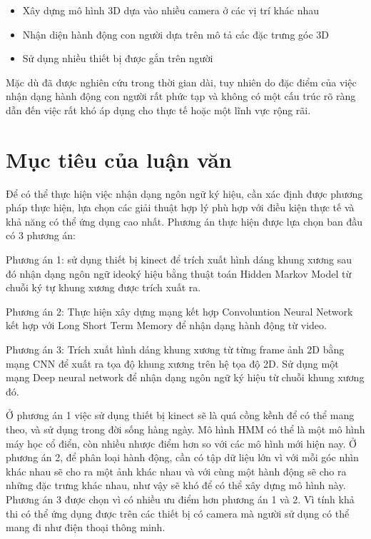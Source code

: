 \begin{itemize}
\item Xây dựng mô hình 3D dựa vào nhiều camera ở các vị trí khác nhau \cite{HLUT1}
\item Nhận diện hành động con người dựa trên mô tả các đặc trưng góc 3D \cite{6693448}
\item Sử dụng nhiều thiết bị được gắn trên người \cite{4650859}
\end{itemize}

Mặc dù đã được nghiên cứu trong thời gian dài, tuy nhiên do đặc điểm của việc nhận dạng hành động con người rất phức tạp và không có một cấu trúc rõ ràng dẫn đến việc rất khó áp dụng cho thực tế hoặc một lĩnh vực rộng rãi.

\section{Mục tiêu của luận văn}

Để có thể thực hiện việc nhận dạng ngôn ngữ ký hiệu, cần xác định được phương pháp thực hiện, lựa chọn các giải thuật hợp lý phù hợp với điều kiện thực tế và khả năng có thể ứng dụng cao nhất.
Phương án thực hiện được lựa chọn ban đầu có 3 phương án: 

Phương án 1: sử dụng thiết bị kinect để trích xuất hình dáng khung xương sau đó nhận dạng ngôn ngữ ideoký hiệu bằng thuật toán Hidden Markov Model từ chuỗi ký tự khung xương được trích xuất ra.

Phương án 2: Thực hiện xây dựng mạng kết hợp Convoluntion Neural Network kết hợp với Long Short Term Memory để nhận dạng hành động từ video.

Phương án 3: Trích xuất hình dáng khung xương từ từng frame ảnh 2D bằng mạng CNN để xuất ra tọa độ khung xương trên hệ tọa độ 2D. Sử dụng một mạng Deep neural network để nhận dạng ngôn ngữ ký hiệu từ chuỗi khung xương đó.

Ở phương án 1 việc sử dụng thiết bị kinect sẽ là quá cồng kềnh để có thể mang theo, và sử dụng trong đời sống hàng ngày. Mô hình HMM có thể là một mô hình máy học cổ điển, còn nhiều nhược điểm hơn so với các mô hình mới hiện nay. Ở phương án 2, để phân loại hành động, cần có tập dữ liệu lớn vì với mỗi góc nhìn khác nhau sẽ cho ra một ảnh khác nhau và với cùng một hành động sẽ cho ra những đặc trưng khác nhau, như vậy sẽ khó để có thể xây dựng mô hình này. Phương án 3 được chọn vì có nhiều ưu điểm hơn phương án 1 và 2. Vì tính khả thi có thể ứng dụng được trên các thiết bị có camera mà người sử dụng có thể mang đi như điện thoại thông minh.

